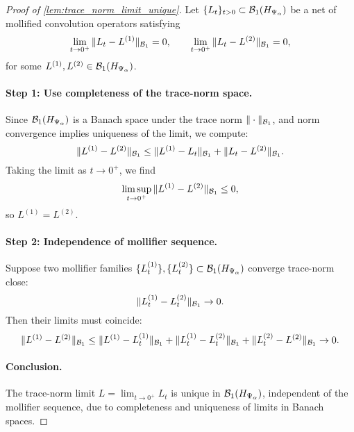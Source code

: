\begin{proof}[Proof of \cref{lem:trace_norm_limit_unique}]
Let \( \{L_t\}_{t > 0} \subset \mathcal{B}_1(H_{\Psi_\alpha}) \) be a net of mollified convolution operators satisfying
\[
\lim_{t \to 0^+} \|L_t - L^{(1)}\|_{\mathcal{B}_1} = 0, \qquad
\lim_{t \to 0^+} \|L_t - L^{(2)}\|_{\mathcal{B}_1} = 0,
\]
for some \( L^{(1)}, L^{(2)} \in \mathcal{B}_1(H_{\Psi_\alpha}) \).

\paragraph{Step 1: Use completeness of the trace-norm space.}
Since \( \mathcal{B}_1(H_{\Psi_\alpha}) \) is a Banach space under the trace norm \( \|\cdot\|_{\mathcal{B}_1} \), and norm convergence implies uniqueness of the limit, we compute:
\[
\|L^{(1)} - L^{(2)}\|_{\mathcal{B}_1}
\le \|L^{(1)} - L_t\|_{\mathcal{B}_1} + \|L_t - L^{(2)}\|_{\mathcal{B}_1}.
\]
Taking the limit as \( t \to 0^+ \), we find
\[
\limsup_{t \to 0^+} \|L^{(1)} - L^{(2)}\|_{\mathcal{B}_1} \le 0,
\]
so \( L^{(1)} = L^{(2)} \).

\paragraph{Step 2: Independence of mollifier sequence.}
Suppose two mollifier families \( \{L_t^{(1)}\}, \{L_t^{(2)}\} \subset \mathcal{B}_1(H_{\Psi_\alpha}) \) converge trace-norm close:
\[
\|L_t^{(1)} - L_t^{(2)}\|_{\mathcal{B}_1} \to 0.
\]
Then their limits must coincide:
\[
\|L^{(1)} - L^{(2)}\|_{\mathcal{B}_1}
\le \|L^{(1)} - L_t^{(1)}\|_{\mathcal{B}_1}
+ \|L_t^{(1)} - L_t^{(2)}\|_{\mathcal{B}_1}
+ \|L_t^{(2)} - L^{(2)}\|_{\mathcal{B}_1} \to 0.
\]

\paragraph{Conclusion.}
The trace-norm limit \( L = \lim_{t \to 0^+} L_t \) is unique in \( \mathcal{B}_1(H_{\Psi_\alpha}) \), independent of the mollifier sequence, due to completeness and uniqueness of limits in Banach spaces.
\end{proof}
